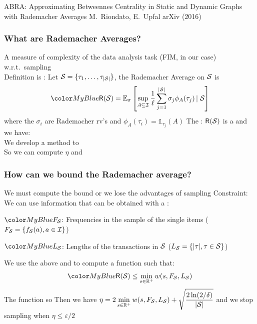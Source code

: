 \begin{frame}
  \centering
  \vfill
  {\huge ABRA: Approximating Betweennes Centrality in Static and Dynamic
  Graphs with Rademacher Averages}
  \vfill
  {\large M.~Riondato, E.~Upfal}
  \vfill
  {\large arXiv (2016)}
  \vfill
\end{frame}

\begin{frame}
  \frametitle{What are Rademacher Averages?}
  A measure of complexity of the data analysis task (FIM, in our case)
  w.r.t.~sampling\\
  \quad {}
  \vfill
  Definition is : Let ${\cal S}=\{\tau_1,\dotsc,\tau_{|{\cal S}|}\}$, the Rademacher
  Average on ${\cal S}$ is
  \[
    \inblue{\Rade(\Sam)=\expectation_\sigma\left[\sup_{A\subseteq\mathcal{I}}\frac{1}{\ell}\sum_{j=1}^{|\Sam|}
    \sigma_j \phi_A(\tau_j)\left|\right. \Sam\right]}
  \]
  where the $\sigma_i$ are Rademacher rv's and $\phi_A(\tau_i)=\mathds{1}_{\tau_j}(A)$
  \vfill
  The : $\mathsf{R}({\cal S})$ is a  and we have:
  \[
  \]
  We develop a method to \\
  \quad So we can compute $\eta$ and 
\end{frame}

\begin{frame}
  \frametitle{How can we bound the Rademacher average?}
  We must compute the bound  or we lose the advantages of sampling
  \vfill
  Constraint: We can use  information that can be obtained with a
  :\\
  \begin{enumerate*}
    \item $\inblue{F_\Sam}$: Frequencies in the sample of the single items ($F_{\cal S}=\{f_{\cal S}(a),
      a\in\mathcal{I}\}$)
    \item $\inblue{L_\Sam}$: Lengths of the transactions in ${\cal S}$ ($L_{\cal S}=\{|\tau|, \tau\in{\cal S}\}$)
  \end{enumerate*}
  \vfill
  We use the above and  to compute a
  function  such that:
  \[
    \inblue{
    \Rade(\Sam)\le \min_{s\in\mathbb{R}^+} w(s,F_\Sam,L_\Sam)
    }
  \]
  The function  so 
  \vfill
  Then we have $\eta= 2 \displaystyle\min_{s\in\mathbb{R}^+} w(s,F_{\cal S},L_{\cal S}) +
  \displaystyle\sqrt{\frac{2\ln(2/\delta)}{|{\cal S}|}}$ and we stop sampling when
  $\eta\le\varepsilon/2$
\end{frame}

